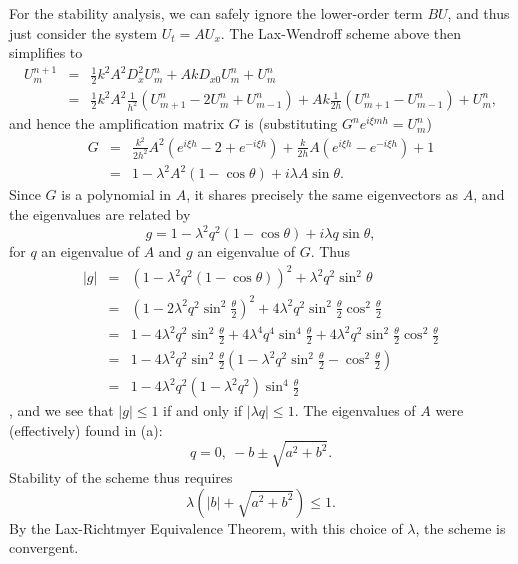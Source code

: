 \documentclass{article}
\begin{document}
\begin{enumerate}
\begin{enumerate}
For the stability analysis, we can safely ignore the lower-order term \(BU\), and thus just consider the system \(U_t = A U_x\).  The Lax-Wendroff scheme above then simplifies to
\begin{eqnarray*}
U^{n+1}_m & = & \frac{1}{2} k^2 A^2 D_x^2 U^n_m + Ak D_{x0} U^n_m + U^n_m \\
          & = & \frac{1}{2} k^2 A^2 \frac{1}{h^2} \left( U^n_{m+1} - 2U^n_m + U^n_{m-1} \right)
              + Ak \frac{1}{2h} \left( U^n_{m+1} - U^n_{m-1} \right)
              + U^n_m,
\end{eqnarray*}
and hence the amplification matrix \(G\) is (substituting \(G^n e^{i\xi mh} = U^n_m\))
\begin{eqnarray*}
G & = & \frac{k^2}{2h^2} A^2 \left( e^{i\xi h} - 2 + e^{-i\xi h} \right)
      + \frac{k}{2h} A \left( e^{i\xi h} - e^{-i\xi h} \right)
      + 1 \\
  & = & 1 - \lambda^2 A^2 (1 - \cos \theta) + i \lambda A \sin \theta.
\end{eqnarray*}
Since \(G\) is a polynomial in \(A\), it shares precisely the same eigenvectors as \(A\), and the eigenvalues are related by
\[g = 1 - \lambda^2 q^2 (1 - \cos \theta) + i \lambda q \sin \theta,\]
for \(q\) an eigenvalue of \(A\) and \(g\) an eigenvalue of \(G\).  Thus
\begin{eqnarray*}
|g| & = & \left( 1 - \lambda^2 q^2 (1 - \cos \theta) \right)^2 + \lambda^2 q^2 \sin^2 \theta \\
    & = & \left( 1 - 2 \lambda^2 q^2 \sin^2 \frac{\theta}{2} \right)^2 + 4 \lambda^2 q^2 \sin^2 \frac{\theta}{2} \cos^2 \frac{\theta}{2} \\
    & = & 1 - 4 \lambda^2 q^2 \sin^2 \frac{\theta}{2} + 4 \lambda^4 q^4 \sin^4 \frac{\theta}{2} + 4 \lambda^2 q^2 \sin^2 \frac{\theta}{2} \cos^2 \frac{\theta}{2} \\
    & = & 1 - 4 \lambda^2 q^2 \sin^2 \frac{\theta}{2} \left( 1 - \lambda^2 q^2 \sin^2 \frac{\theta}{2} - \cos^2 \frac{\theta}{2} \right) \\
    & = & 1 - 4 \lambda^2 q^2 \left( 1 - \lambda^2 q^2 \right) \sin^4 \frac{\theta}{2}
\end{eqnarray*},
and we see that \(|g| \leq 1\) if and only if \(|\lambda q| \leq 1\).  The eigenvalues of \(A\) were (effectively) found in (a):
\[q = 0, \ -b \pm \sqrt{a^2 + b^2}.\]
Stability of the scheme thus requires
\[\lambda \left( |b| + \sqrt{a^2 + b^2} \right) \leq 1.\]
By the Lax-Richtmyer Equivalence Theorem, with this choice of \(\lambda\), the scheme is convergent.


\end{enumerate}
\end{enumerate}
\end{document}
